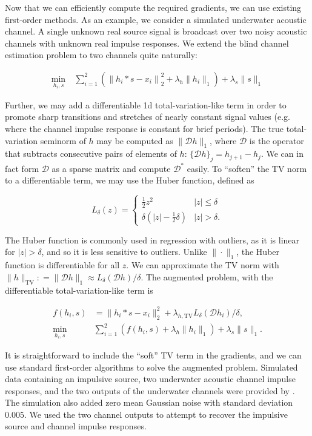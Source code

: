 \documentclass[journal]{IEEEtran}
\newcommand{\defeq}{\mathrel{\mathop:}=}
\begin{document}
Now that we can efficiently compute the required gradients, we can use existing first-order methods.  As an example, we consider a simulated underwater acoustic channel.  A single unknown real source signal is broadcast over two noisy acoustic channels with unknown real impulse responses.  We extend the blind channel estimation problem to two channels quite naturally:

\begin{align*}
   \min_{h_i,s} ~&\sum_{i=1}^2\left(\left\|h_i\ast s - x_i\right\|_2^2 + \lambda_{h}\|h_i\|_1\right) + \lambda_s\|s\|_1
\end{align*}

\noindent Further, we may add a differentiable 1d total-variation-like term in order to promote sharp transitions and stretches of nearly constant signal values (e.g. where the channel impulse response is constant for brief periods).  The true total-variation seminorm of $h$ may be computed as $\|\mathcal{D}h\|_1$, where $\mathcal{D}$ is the operator that subtracts consecutive pairs of elements of $h$: $\{\mathcal{D}h\}_j = h_{j+1} - h_j$.  We can in fact form $\mathcal{D}$ as a sparse matrix and compute $\mathcal{D}^\ast$ easily.  To ``soften'' the TV norm to a differentiable term, we may use the Huber function, defined as

\[ L_\delta(z) = \left\{\begin{array}{ll} \frac{1}{2}z^2 & |z| \le \delta\\ \delta\left(|z| - \frac{1}{2}\delta\right) & |z| > \delta. \end{array}\right. \] 

\noindent The Huber function is commonly used in regression with outliers, as it is linear for $|z|>\delta$, and so it is less sensitive to outliers.  Unlike $\|\cdot\|_1$, the Huber function is differentiable for all $z$.  We can approximate the TV norm with ${\|h\|_\text{TV} \defeq\|\mathcal{D}h\|_1 \approx L_\delta(\mathcal{D}h)/\delta}$.  The augmented problem, with the differentiable total-variation-like term is

\begin{align}
   \label{eq:bce_aug}
   f(h_i,s) &= \|h_i\ast s - x_i\|_2^2 + \lambda_{h,\text{TV}}L_\delta(\mathcal{D}h_i)/\delta,\nonumber\\
   \min_{h_i,s} ~&\sum_{i=1}^2\left(f(h_i,s) + \lambda_h\|h_i\|_1\right) + \lambda_s\|s\|_1.
\end{align}

It is straightforward to include the ``soft'' TV term in the gradients, and we can use standard first-order algorithms to solve the augmented problem.  Simulated data containing an impulsive source, two underwater acoustic channel impulse responses, and the two outputs of the underwater channels were provided by \cite{rideout_2016}.  The simulation also added zero mean Gaussian noise with standard deviation $0.005$.  We used the two channel outputs to attempt to recover the impulsive source and channel impulse responses.\\
\end{document}
